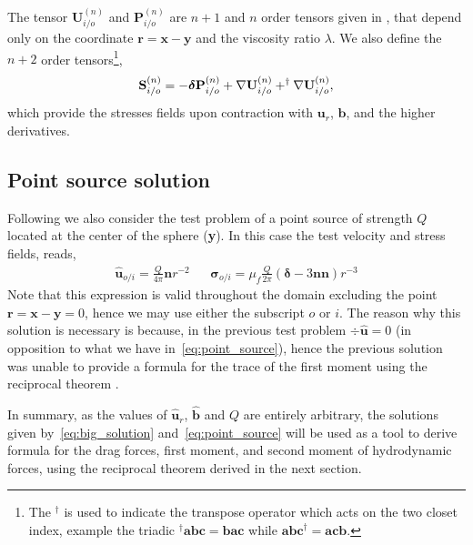 The tensor $\textbf{U}_{i/o}^{(n)}$ and $\textbf{P}_{i/o}^{(n)}$ are $n+1$ and $n$ order tensors given in \citet[Appendix F]{fintzi2024averaged}, that depend only on the coordinate $\textbf{r} = \textbf{x}-\textbf{y}$ and the viscosity ratio $\lambda$.
We also define the $n+2$ order tensors\footnote{The $^\dagger$ is used to indicate the transpose operator which acts on the two closet index, example the triadic $^\dagger\textbf{abc} = \textbf{bac}$ while $\textbf{abc}^\dagger = \textbf{acb}$. }, 
\begin{equation}
    \textbf{S}_{i/o}^{(n)} = 
    - \bm\delta\textbf{P}_{i/o}^{(n)}
    + \grad \textbf{U}_{i/o}^{(n)}
    + ^\dagger\grad \textbf{U}_{i/o}^{(n)},
    \label{eq:big_S}
\end{equation}
which provide the stresses fields upon contraction with $\textbf{u}_r$, $\textbf{b}$, and the higher derivatives. 

\subsection{Point source solution}



Following \citet{stone2001inertial} we also consider the test problem of a point source of strength $Q$ located at the center of the sphere (\textbf{y}).
In this case the test velocity  and stress fields, reads\citep{pozrikidis2011introduction,pozrikidis1992boundary}, 
\begin{align}
    \hat{\textbf{u}}_{o/i} = \frac{Q}{4\pi} \textbf{n}r^{-2}
    && \hat{\bm\sigma}_{o/i} = \mu_f \frac{Q}{2\pi}\left(
        \bm\delta
        - 3 \textbf{nn}
    \right)r^{-3}
    \label{eq:point_source}
\end{align}
Note that this expression is valid throughout the domain excluding the point $\textbf{r} =  \textbf{x} -  \textbf{y} = 0$, hence we may use either the subscript $o$ or $i$. 
The reason why this solution is necessary is because, in the previous test problem $\div \hat{\textbf{u}}= 0$ (in opposition to what we have in~\ref{eq:point_source}), hence the previous solution was unable to provide a formula for the trace of the first moment using the reciprocal theorem \citep{stone2001inertial}.

In summary, as the values of $\hat{\textbf{u}}_r$, $\hat{\textbf{b}}$ and $Q$ are entirely arbitrary, the solutions given by~\ref{eq:big_solution} and~\ref{eq:point_source} will be used as a tool to derive formula for the drag forces, first moment, and second moment of hydrodynamic forces, using the reciprocal theorem derived in the next section.  

